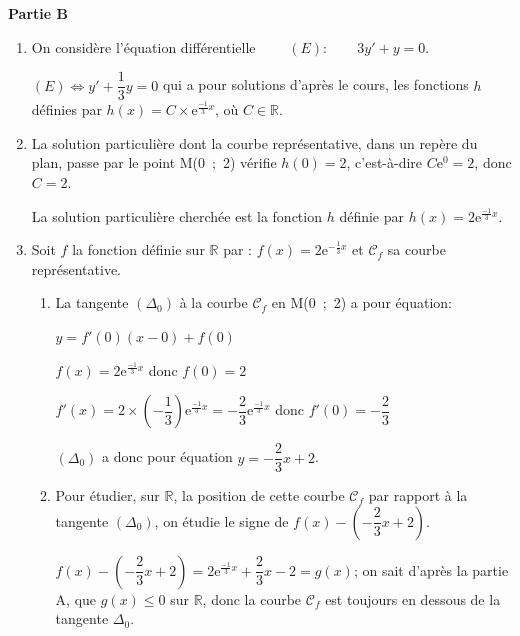 \documentclass[10pt]{article}
\providecommand{\R}{\mathbb{R}}
\providecommand{\e}{{\mathrm{e}}}
\begin{document}
\textbf{Partie B}

\medskip

\begin{enumerate}
\item On considère l'équation différentielle
$\qquad (E) :\qquad  3y' + y = 0.$



$(E) \iff y'+\dfrac{1}{3}y=0$ qui a pour solutions d'après le cours, les fonctions $h$ définies par $h(x)=C\times \e^{\frac{-1}{3}x}$, où $C\in\R$.

\item La solution particulière dont la courbe représentative, dans un repère du plan, passe par le point M(0~;~2) vérifie $h(0)=2$, c'est-à-dire $C\e^{0}=2$, donc $C=2$.

La solution particulière cherchée est la fonction $h$ définie par $h(x)=2\e^{\frac{-1}{3}x}$.

\item Soit $f$ la fonction définie sur $\R$ par :
$f(x) = 2\text{e}^{- \frac{1}{3}x}$
 et $\mathcal{C}_f$ sa courbe représentative.
 
	\begin{enumerate}
		\item La tangente $\left(\Delta_0\right)$ à la courbe $\mathcal{C}_f$ en M(0~;~2) a pour équation:
		
$y=f'(0)\left (x-0\right ) + f(0)$		

$f(x)=2\e^{\frac{-1}{3}x}$ donc $f(0)=2$

$f'(x)= 2\times \left ( -\dfrac{1}{3} \right ) \e^{\frac{-1}{3}x} = -\dfrac{2}{3}\e^{\frac{-1}{3}x}$ donc $f'(0)=-\dfrac{2}{3}$
		
$\left(\Delta_0\right)$ a donc pour équation $y= - \dfrac{2}{3}x + 2$.

		\item Pour étudier, sur $\R$, la position de cette courbe  $\mathcal{C}_f$ par rapport à la tangente $\left(\Delta_0\right)$, on étudie le signe de $f(x)-\left ( -\dfrac{2}{3}x +2\right )$.
		
$f(x)-\left ( -\dfrac{2}{3}x +2\right ) = 2\e^{\frac{-1}{3}x} +\dfrac{2}{3}x - 2 = g(x)$; on sait d'après la partie A, que $g(x)\leqslant 0$ sur $\R$, donc la courbe $\mathcal{C}_f$ est toujours en dessous de la tangente $\Delta_0$.		
		
	\end{enumerate}
\end{enumerate}

\bigskip
\end{document}
